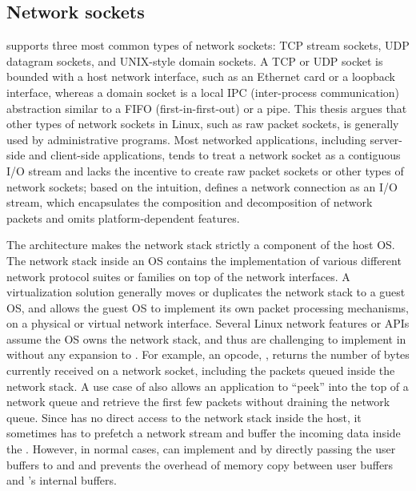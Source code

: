\subsection{Network sockets}
\label{sec:libos:socket}

\thelibos{} supports three most common types of network sockets: TCP stream sockets, UDP datagram sockets, and UNIX-style domain sockets.
A TCP or UDP socket is bounded with a host network interface,
such as an Ethernet card or a loopback interface,
whereas a domain socket is a local IPC (inter-process communication) abstraction
similar to a FIFO (first-in-first-out) or a pipe.
This thesis argues that other types of network sockets
in Linux, such as raw packet sockets, is generally used by administrative programs.
Most networked applications, including server-side and client-side applications, tends to treat a network socket
as a contiguous I/O stream and lacks the incentive to create raw packet sockets or other types of network sockets; based on the intuition,
\thehostabi{} defines a network connection as an I/O stream, which encapsulates the composition and decomposition of network packets
and omits platform-dependent features.

The \graphene{} architecture makes the network stack strictly a component of the host OS.
The network stack inside an OS contains the implementation of various different network protocol suites or families on top of the network interfaces.
A virtualization solution generally moves or duplicates
the network stack to a guest OS,
and allows the guest OS to implement its own packet processing mechanisms,
on a physical or virtual network interface.
Several Linux network features or APIs assume
the OS owns the network stack, and thus are challenging to implement in \thelibos{}
without any expansion to \thehostabi{}.
For example,
an  opcode, ,
returns the number of bytes currently received on a network socket, including the packets queued inside the network stack. 
A use case of  also allows an application
to ``peek'' into the top of a network queue
and retrieve the first few packets without draining the network queue.
Since \thelibos{} has no direct access to the network stack
inside the host,
it sometimes has to prefetch a network stream
and buffer the incoming data inside the \picoproc{}.
However, in normal cases, \thelibos{} can implement  and  by directly passing the user buffers to  and  and prevents the overhead of memory copy between user buffers and \thelibos{}'s internal buffers. 




